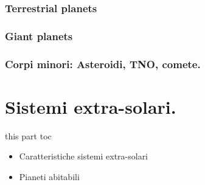 \documentclass[10pt,xcolor={usenames},fleqn,mathserif,serif]{beamer}
\begin{document}
\section{Terrestrial planets}\label{sec:terrestrials}


\section{Giant planets}\label{sec:giants}


\section{Corpi minori: Asteroidi, TNO, comete.}\label{sec:asteroidscomets}


\part{Sistemi extra-solari.}\label{part:exosystem}

\begin{frame}{this part toc}
\begin{itemize}
\item Caratteristiche sistemi extra-solari
\item Pianeti abitabili
\end{itemize}
\end{frame}



\clearpage

\listofframes
\end{document}
